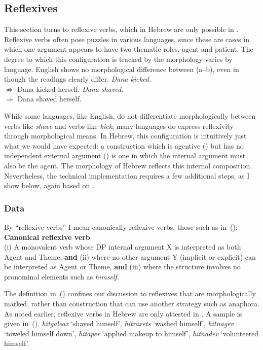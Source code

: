 {{	\subsection{Reflexives} \label{vz:thit:refl}
This section turns to reflexive verbs, which in Hebrew are only possible in {\thit}. Reflexive verbs often pose puzzles in various languages, since these are cases in which one argument appears to have two thematic roles, agent and patient. The degree to which this configuration is tracked by the morphology varies by language. English shows no morphological difference between (\nextx a--b), even in though the readings clearly differ.
\pex \a \emph{Dana kicked.}\\
		$\nRightarrow$ Dana kicked herself.
	\a \emph{Dana shaved}.\\
		$\Rightarrow$ Dana shaved herself.
\xe

While some languages, like English, do not differentiate morphologically between verbs like \emph{shave} and verbs like \emph{kick}, many languages do express reflexivity through morphological means. In Hebrew, this configuration is intuitively just what we would have expected: a construction which is agentive (\va) but has no independent external argument (\vz) is one in which the internal argument must also be the agent. The morphology of Hebrew reflects this internal composition. Nevertheless, the technical implementation requires a few additional steps, as I show below, again based on \citep{kastner17gjgl}.

		\subsubsection{Data}
By ``reflexive verbs'' I mean canonically reflexive verbs, those such as in~(\nextx):
\ex \textbf{Canonical reflexive verb}\\
	(i) A monovalent verb whose DP internal argument X is interpreted as both Agent and Theme, \textbf{and} (ii) where no other argument Y (implicit or explicit) can be interpreted as Agent or Theme, \textbf{and} (iii) where the structure involves no pronominal elements such as \emph{himself}.
\xe

The definition in~(\lastx) confines our discussion to reflexives that are morphologically marked, rather than construction that can use another strategy such as anaphora. As noted earlier, reflexive verbs in Hebrew are only attested in \thit. A sample is given in~(\nextx).
\ex\label{ex:refl}\emph{hitgaleax} `shaved himself', \emph{hitraxets} `washed himself', \emph{hitnagev} `toweled himself down', \emph{hitaper} `applied makeup to himself', \emph{hitnadev} `volunteered himself'.
\xe

}}
